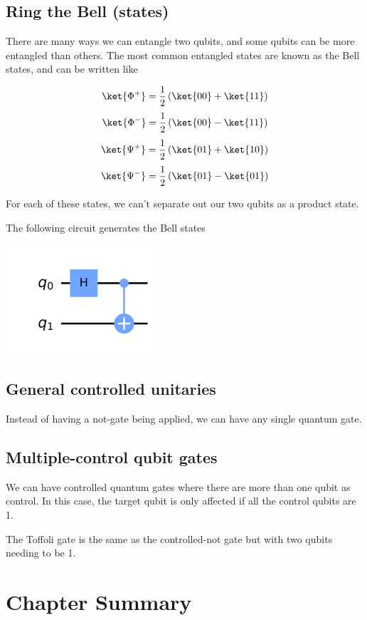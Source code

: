\documentclass{book}
\begin{document}
\subsection{ Ring the Bell (states)}

There are many ways we can entangle two qubits, and some qubits can be more entangled than others. The most common entangled states are known as the Bell states, and can be written like

$$ \ket{\Phi^+} = \frac{1}{2} \left( \ket{00} + \ket{11} \right) $$
$$ \ket{\Phi^-} = \frac{1}{2} \left( \ket{00} - \ket{11} \right) $$
$$ \ket{\Psi^+} = \frac{1}{2} \left( \ket{01} + \ket{10} \right) $$
$$ \ket{\Psi^-} = \frac{1}{2} \left( \ket{01} - \ket{01} \right) $$

For each of these states, we can't separate out our two qubits as a product state. 


The following circuit generates the Bell states

\includegraphics{images/Bell_State_circuit.png}


\subsection{General controlled unitaries }

Instead of having a not-gate being applied, we can have any single quantum gate.

\subsection{Multiple-control qubit gates }

We can have controlled quantum gates where there are more than one qubit as control. In this case, the target qubit is only affected if all the control qubits are 1. 

The Toffoli gate is the same as the controlled-not gate but with two qubits needing to be 1.

\section{Chapter Summary}
\end{document}
